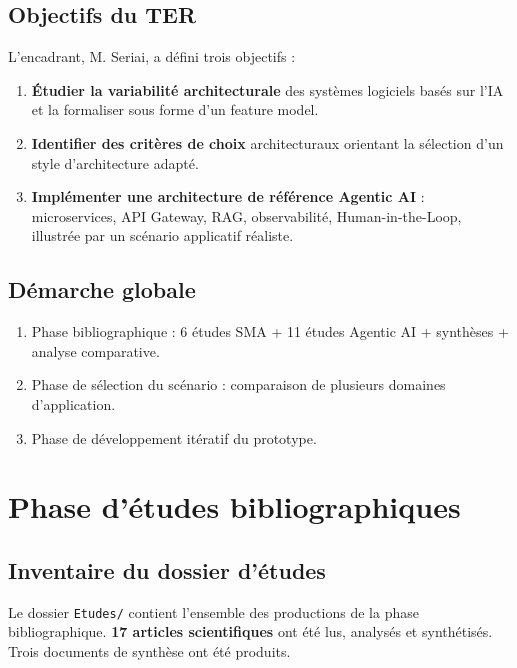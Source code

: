 \documentclass[12pt,a4paper]{report}
\begin{document}
\section{Objectifs du TER}

L'encadrant, M. Seriai, a défini trois objectifs :

\begin{enumerate}
  \item \textbf{Étudier la variabilité architecturale} des systèmes logiciels basés
        sur l'IA et la formaliser sous forme d'un feature model.
  \item \textbf{Identifier des critères de choix} architecturaux orientant la
        sélection d'un style d'architecture adapté.
  \item \textbf{Implémenter une architecture de référence Agentic AI} : microservices,
        API Gateway, RAG, observabilité, Human-in-the-Loop, illustrée par un scénario
        applicatif réaliste.
\end{enumerate}

\section{Démarche globale}

\begin{enumerate}
  \item Phase bibliographique : 6 études SMA + 11 études Agentic AI + synthèses +
        analyse comparative.
  \item Phase de sélection du scénario : comparaison de plusieurs domaines d'application.
  \item Phase de développement itératif du prototype.
\end{enumerate}

\chapter{Phase d'études bibliographiques}
\label{chap:etudes}

\section{Inventaire du dossier d'études}

Le dossier \texttt{Etudes/} contient l'ensemble des productions de la phase
bibliographique. \textbf{17 articles scientifiques} ont été lus, analysés et
synthétisés. Trois documents de synthèse ont été produits.
\end{document}
